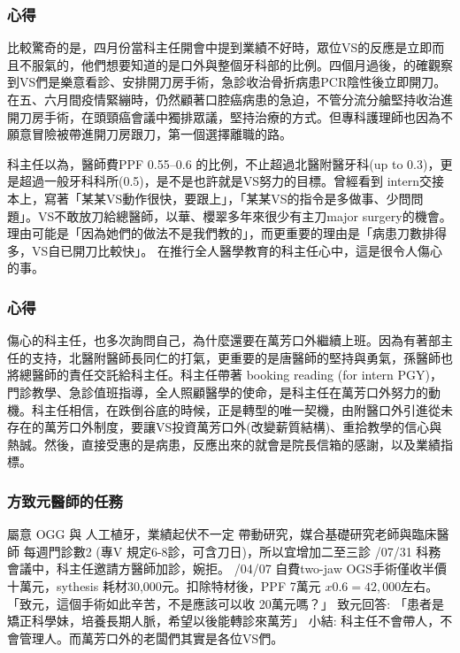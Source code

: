 \documentclass[t,24pt,aspectratio=169]{beamer}
\begin{document}
\begin{frame}[hoved]
\frametitle{心得}
比較驚奇的是，四月份當科主任開會中提到業績不好時，眾位VS的反應是立即而且不服氣的，他們想要知道的是口外與整個牙科部的比例。四個月過後，的確觀察到VS們是樂意看診、安排開刀房手術，急診收治骨折病患PCR陰性後立即開刀。在五、六月間疫情緊繃時，仍然顧著口腔癌病患的急迫，不管分流分艙堅持收治進開刀房手術，在頭頸癌會議中獨排眾議，堅持治療的方式。但專科護理師也因為不願意冒險被帶進開刀房跟刀，第一個選擇離職的路。


科主任以為，醫師費PPF 0.55--0.6 的比例，不止超過北醫附醫牙科(up to 0.3)，更是超過一般牙科科所(0.5)，是不是也許就是VS努力的目標。曾經看到 intern交接本上，寫著「某某VS動作很快，要跟上」，「某某VS的指令是多做事、少問問題」。VS不敢放刀給總醫師，以華、櫻翠多年來很少有主刀major surgery的機會。理由可能是「因為她們的做法不是我們教的」，而更重要的理由是「病患刀數排得多，VS自已開刀比較快」。
在推行全人醫學教育的科主任心中，這是很令人傷心的事。
\end{frame}



\begin{frame}[hoved]
\frametitle{心得}
傷心的科主任，也多次詢問自己，為什麼還要在萬芳口外繼續上班。因為有著部主任的支持，北醫附醫師長同仁的打氣，更重要的是唐醫師的堅持與勇氣，孫醫師也將總醫師的責任交託給科主任。科主任帶著 booking reading (for intern PGY)，門診教學、急診值班指導，全人照顧醫學的使命，是科主任在萬芳口外努力的動機。科主任相信，在跌倒谷底的時候，正是轉型的唯一契機，由附醫口外引進從未存在的萬芳口外制度，要讓VS投資萬芳口外(改變薪質結構)、重拾教學的信心與熱誠。然後，直接受惠的是病患，反應出來的就會是院長信箱的感謝，以及業績指標。
\end{frame}



\begin{frame}[hoved]
\frametitle{方致元醫師的任務}
\begin{outline}
\1 屬意 OGG 與 人工植牙，業績起伏不一定
\1 帶動研究，媒合基礎研究老師與臨床醫師
\1 每週門診數2 (專V 規定6-8診，可含刀日)，所以宜增加二至三診
    /07/31 科務會議中，科主任邀請方醫師加診，婉拒。
/04/07 自費two-jaw OGS手術僅收半價十萬元，sythesis 耗材30,000元。扣除特材後，PPF 7萬元 $x 0.6 = 42,000$左右。
    \2 「致元，這個手術如此辛苦，不是應該可以收 20萬元嗎？」
    \2 致元回答: 「患者是矯正科學妹，培養長期人脈，希望以後能轉診來萬芳」
\1 小結: 科主任不會帶人，不會管理人。而萬芳口外的老闆們其實是各位VS們。
\end{outline}


\end{frame}
\end{document}
